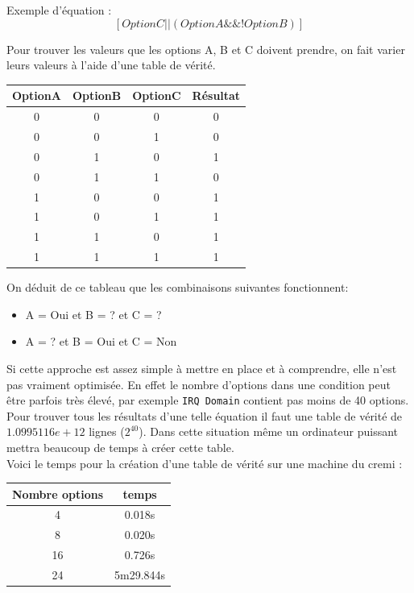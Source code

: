 \documentclass[16pts]{report}
\begin{document}
Exemple d'équation :
\[[OptionC || (OptionA \&\& !OptionB)]\]

Pour trouver les valeurs que les options A, B et C doivent prendre, on fait
varier leurs valeurs à l'aide d'une table de vérité.  \\
\begin{tabular}{|c|c|c||c|}
    \hline
    OptionA & OptionB & OptionC & Résultat\\
    \hline
    \hline
    0 & 0 & 0 & 0\\
    \hline
    0 & 0 & 1 & 0\\
    \hline
    0 & 1 & 0 & 1\\
    \hline
    0 & 1 & 1 & 0\\
    \hline
    1 & 0 & 0 & 1\\
    \hline
    1 & 0 & 1 & 1\\
    \hline
    1 & 1 & 0 & 1\\
    \hline
    1 & 1 & 1 & 1\\
    \hline
\end{tabular}

On déduit de ce tableau que les combinaisons suivantes fonctionnent:
\begin{itemize}
    \item A = Oui et B = ?   et C = ?   \\
    \item A = ?   et B = Oui et C = Non \\
\end{itemize}

Si cette approche est assez simple à mettre en place et à comprendre, elle
n'est pas vraiment optimisée. En effet le nombre d'options dans une condition
peut être parfois très élevé, par exemple \verb|IRQ Domain| contient pas
moins de 40 options.\\
Pour trouver tous les résultats d'une telle équation il faut une table
de vérité de $1.0995116e+12$ lignes ($2^{40}$). Dans cette situation même
un ordinateur puissant mettra beaucoup de temps à créer cette table.
\\
Voici le temps pour la création d'une table de vérité sur une machine du cremi : 

\begin{tabular}{|c|c|}
    \hline
    Nombre options & temps\\
    \hline
    \hline
    4 & 0.018s\\
    \hline
    8 & 0.020s\\
    \hline
    16 & 0.726s\\
    \hline
    24 & 5m29.844s\\
    \hline
\end{tabular}
\end{document}

